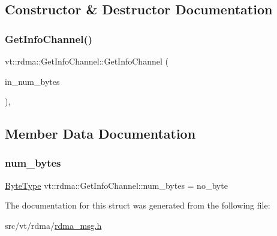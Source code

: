\subsection{Constructor \& Destructor Documentation}
\mbox{\label{structvt_1_1rdma_1_1_get_info_channel_ad3a1b099ae810ad811012ac973f525b2}} 
\subsubsection{\texorpdfstring{Get\+Info\+Channel()}{GetInfoChannel()}}
{\footnotesize\ttfamily vt\+::rdma\+::\+Get\+Info\+Channel\+::\+Get\+Info\+Channel (\begin{DoxyParamCaption}\item[{\hyperlink{namespacevt_aab8d55968084610ce3b17057981e9300}{Byte\+Type}}]{in\+\_\+num\+\_\+bytes }\end{DoxyParamCaption})\hspace{0.3cm}{\ttfamily [inline]}, {\ttfamily [explicit]}}



\subsection{Member Data Documentation}
\mbox{\label{structvt_1_1rdma_1_1_get_info_channel_a70892023d33a2578d7888b7652e643ea}} 
\subsubsection{\texorpdfstring{num\+\_\+bytes}{num\_bytes}}
{\footnotesize\ttfamily \hyperlink{namespacevt_aab8d55968084610ce3b17057981e9300}{Byte\+Type} vt\+::rdma\+::\+Get\+Info\+Channel\+::num\+\_\+bytes = no\+\_\+byte}



The documentation for this struct was generated from the following file\+:\begin{DoxyCompactItemize}
\item 
src/vt/rdma/\hyperlink{rdma__msg_8h}{rdma\+\_\+msg.\+h}\end{DoxyCompactItemize}
